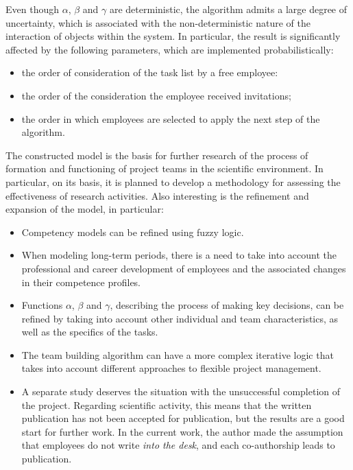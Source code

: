 \documentclass[12pt]{report}
\theoremstyle{definition}
\begin{document}
Even though $\alpha$, $\beta$ and $\gamma$ are deterministic, the algorithm admits a large degree of uncertainty, which is associated with the non-deterministic nature of the interaction of objects within the system. 
In particular, the result is significantly affected by the following parameters, which are implemented probabilistically:
\begin{itemize}
	\item the order of consideration of the task list by a free employee:
	\item the order of the consideration the employee received invitations;
	\item the order in which employees are selected to apply the next step of the algorithm. 
\end{itemize}

The constructed model is the basis for further research of the process of formation and functioning of project teams in the scientific environment. 
In particular, on its basis, it is planned to develop a methodology for assessing the effectiveness of research activities.
Also interesting is the refinement and expansion of the model, in particular:

\begin{itemize}
	\item 
	Competency models can be refined using fuzzy logic.
	\item 
	When modeling long-term periods, there is a need to take into account the professional and career development of employees and the associated changes in their competence profiles. 
	\item 
	Functions $\alpha$, $\beta$ and $\gamma$, describing the process of making key decisions, can be refined by taking into account other individual and team characteristics, as well as the specifics of the tasks.
	\item 
	The team building algorithm can have a more complex iterative logic that takes into account different approaches to flexible project management.
	\item 
	A separate study deserves the situation with the unsuccessful completion of the project. 
	Regarding scientific activity, this means that the written publication has not been accepted for publication, but the results are a good start for further work. 
	In the current work, the author made the assumption that employees do not write \textit{into the desk}, and each co-authorship leads to publication.
\end{itemize}
\end{document}
